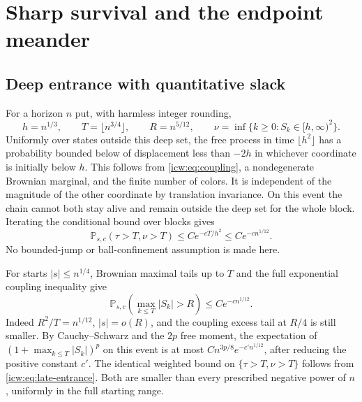 \documentclass[11pt,letterpaper]{article}
\theoremstyle{remark}\newtheorem{remark}[theorem]{Remark}
\newcommand{\Prob}{\mathbb P}
\newcommand{\1}{\mathbf1}
\begin{document}
\section{Sharp survival and the endpoint meander}\label{icw:sec:entrance}
\subsection{Deep entrance with quantitative slack}
For a horizon $n$ put, with harmless integer rounding,
\begin{equation}\label{icw:eq:entrance-scales}
 h=n^{1/3},\qquad T=\lfloor n^{3/4}\rfloor,\qquad
 R=n^{5/12},\qquad
 \nu=\inf\{k\ge0:S_k\in[h,\infty)^2\}.
\end{equation}
Uniformly over states outside this deep set, the free process in time
$\lfloor h^2\rfloor$ has a probability bounded below of displacement
less than $-2h$ in whichever coordinate is initially below $h$.
This follows from \eqref{icw:eq:coupling}, a nondegenerate Brownian marginal,
and the finite number of colors. It is independent of the magnitude
of the other coordinate by translation invariance. On this event the
chain cannot both stay alive and remain outside the deep set for the
whole block. Iterating the conditional bound over blocks gives
\begin{equation}\label{icw:eq:late-entrance}
 \Prob_{s,c}(\tau>T,\nu>T)\le Ce^{-cT/h^2}
 \le Ce^{-cn^{1/12}}.
\end{equation}
No bounded-jump or ball-confinement assumption is made here.

For starts $|s|\le n^{1/4}$, Brownian maximal tails up to $T$ and the
full exponential coupling inequality give
\begin{equation}\label{icw:eq:large-entrance}
 \Prob_{s,c}\left(\max_{k\le T}|S_k|>R\right)
 \le Ce^{-cn^{1/12}}.
\end{equation}
Indeed $R^2/T=n^{1/12}$, $|s|=o(R)$, and the coupling excess tail at
$R/4$ is still smaller. By Cauchy--Schwarz and the $2p$ free moment,
the expectation of
$(1+\max_{k\le T}|S_k|)^p$ on this event is at most
$C n^{3p/8}e^{-c'n^{1/12}}$, after reducing the positive constant
$c'$. The identical weighted bound on $\{\tau>T,\nu>T\}$ follows
from \eqref{icw:eq:late-entrance}. Both are smaller than every prescribed
negative power of $n$, uniformly in the full starting range.
\end{document}
